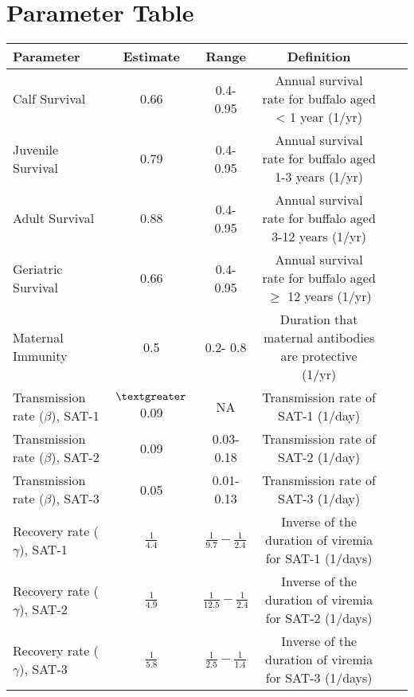 \documentclass[letterpaper,12pt]{article}
\begin{document}
\section{Parameter Table} 
\begin{table}[ht]
\scriptsize
\centering
\begin{tabular}{l c c c c c}
\hline\hline
Parameter & Estimate & Range & Definition  \\ [0.5ex]
\hline 
Calf Survival & 0.66 & 0.4- 0.95 & Annual survival rate for buffalo aged < 1 year (1/yr)\\ %
Juvenile Survival & 0.79 & 0.4- 0.95 & Annual survival rate for buffalo aged 1-3 years (1/yr) \\
Adult Survival & 0.88 & 0.4- 0.95 &  Annual survival rate for buffalo aged 3-12 years (1/yr)\\
Geriatric Survival & 0.66 & 0.4- 0.95 & Annual survival rate for buffalo aged $\geq$ 12 years (1/yr)  \\
Maternal Immunity & 0.5 & 0.2- 0.8 & Duration that maternal antibodies are protective (1/yr)\\
Transmission rate ($\beta$), SAT-1 & $\textgreater$ 0.09 & NA & Transmission rate of SAT-1 (1/day)\\
Transmission rate ($\beta$), SAT-2 & 0.09 & 0.03- 0.18 & Transmission rate of SAT-2 (1/day) \\
Transmission rate ($\beta$), SAT-3 & 0.05 & 0.01- 0.13 & Transmission rate of SAT-3 (1/day) \\
Recovery rate ($\gamma$), SAT-1 & $\frac{1}{4.4}$ &  $\frac{1}{9.7}-  \frac{1}{2.4}$ & Inverse of the duration of viremia for SAT-1 (1/days) \\
Recovery rate ($\gamma$), SAT-2 & $\frac{1}{4.9}$ &  $\frac{1}{12.5}-  \frac{1}{2.4}$ & Inverse of the duration of viremia for SAT-2 (1/days) \\
Recovery rate ($\gamma$), SAT-3 & $\frac{1}{5.8}$ &  $\frac{1}{2.5}-  \frac{1}{1.4}$ & Inverse of the duration of viremia for SAT-3 (1/days)\\
\hline
\end{tabular}
\label{table:nonlin}
\end{table}
\end{document}
